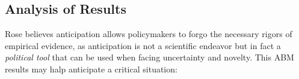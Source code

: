 \documentclass[doc,12pt,floatsintext]{apa7}
\begin{document}
\clearpage
\subsection{Analysis of Results}



Rose \parencite{rose_lesson-drawing_1993} believes anticipation allows policymakers to forgo the necessary rigors of empirical evidence, as anticipation is not a scientific endeavor but in fact a \emph{political tool} that can be used when facing uncertainty and novelty. This ABM results may halp anticipate a critical situation:
\end{document}
